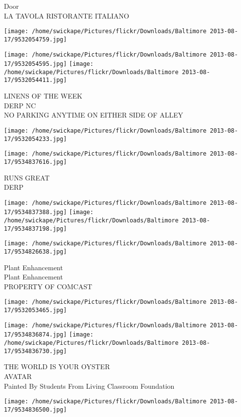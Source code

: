 \documentclass[10pt,letterpaper]{article}
\begin{document}
Door\\
LA TAVOLA RISTORANTE ITALIANO
\pagebreak

\texttt{[image: /home/swickape/Pictures/flickr/Downloads/Baltimore 2013-08-17/9532054759.jpg]}

\vspace{0.25in}
\texttt{[image: /home/swickape/Pictures/flickr/Downloads/Baltimore 2013-08-17/9532054595.jpg]}
\texttt{[image: /home/swickape/Pictures/flickr/Downloads/Baltimore 2013-08-17/9532054411.jpg]}

LINENS OF THE WEEK\\
DERP NC\\
NO PARKING ANYTIME ON EITHER SIDE OF ALLEY
\pagebreak

\texttt{[image: /home/swickape/Pictures/flickr/Downloads/Baltimore 2013-08-17/9532054233.jpg]}

\vspace{0.25in}
\texttt{[image: /home/swickape/Pictures/flickr/Downloads/Baltimore 2013-08-17/9534837616.jpg]}

RUNS GREAT\\
DERP
\pagebreak

\texttt{[image: /home/swickape/Pictures/flickr/Downloads/Baltimore 2013-08-17/9534837388.jpg]}
\texttt{[image: /home/swickape/Pictures/flickr/Downloads/Baltimore 2013-08-17/9534837198.jpg]}

\texttt{[image: /home/swickape/Pictures/flickr/Downloads/Baltimore 2013-08-17/9534826638.jpg]}

Plant Enhancement\\
Plant Enhancement\\
PROPERTY OF COMCAST
\pagebreak

\texttt{[image: /home/swickape/Pictures/flickr/Downloads/Baltimore 2013-08-17/9532053465.jpg]}

\vspace{0.25in}
\texttt{[image: /home/swickape/Pictures/flickr/Downloads/Baltimore 2013-08-17/9534836874.jpg]}
\texttt{[image: /home/swickape/Pictures/flickr/Downloads/Baltimore 2013-08-17/9534836730.jpg]}

THE WORLD IS YOUR OYSTER\\
AVATAR\\
Painted By Students From Living Classroom Foundation
\pagebreak

\texttt{[image: /home/swickape/Pictures/flickr/Downloads/Baltimore 2013-08-17/9534836500.jpg]}
\end{document}
